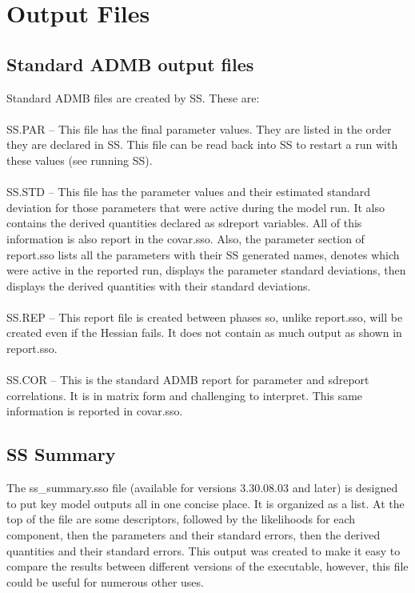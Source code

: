 \section{Output Files}
\subsection{Standard ADMB output files}
Standard ADMB files are created by SS.  These are:\\
\\
SS.PAR – This file has the final parameter values.  They are listed in the order they are declared in SS.  This file can be read back into SS to restart a run with these values (see running SS).\\
\\
SS.STD – This file has the parameter values and their estimated standard deviation for those parameters that were active during the model run.  It also contains the derived quantities declared as sdreport variables.  All of this information is also report in the covar.sso.  Also, the parameter section of report.sso lists all the parameters with their SS generated names, denotes which were active in the reported run, displays the parameter standard deviations, then displays the derived quantities with their standard deviations.\\
\\
SS.REP – This report file is created between phases so, unlike report.sso, will be created even if the Hessian fails.  It does not contain as much output as shown in report.sso.\\
\\
SS.COR – This is the standard ADMB report for parameter and sdreport correlations.  It is in matrix form and challenging to interpret.  This same information is reported in covar.sso.

\subsection{SS Summary}
The ss\_summary.sso file (available for versions 3.30.08.03 and later) is designed to put key model outputs all in one concise place.  It is organized as a list.  At the top of the file are some descriptors, followed by the likelihoods for each component, then the parameters and their standard errors, then the derived quantities and their standard errors.  This output was created to make it easy to compare the results between different versions of the executable, however, this file could be useful for numerous other uses. 

